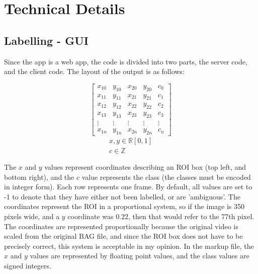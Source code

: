 \section{Technical Details}
    \subsection{Labelling - GUI}
    Since the app is a web app, the code is divided into two parts, the server code, and the client code. The layout of the output is as follows:

    \[
    \begin{bmatrix}
    x_{10} & y_{10} & x_{20} & y_{20} & c_{0} \\
    x_{11} & y_{11} & x_{21} & y_{21} & c_{1} \\
    x_{12} & y_{12} & x_{22} & y_{22} & c_{2} \\
    x_{13} & y_{13} & x_{23} & y_{23} & c_{3} \\
    \vdots & \vdots & \vdots & \vdots & \vdots\\
    x_{1n} & y_{1n} & x_{2n} & y_{2n} & c_{n} 
    \end{bmatrix}
    \]
    \begin{gather*}
    x, y \in \mathbb{R} [0, 1]\\
    c \in \mathbb{Z}
    \end{gather*}

    The $x$ and $y$ values represent coordinates describing an ROI box (top left, and bottom right), and the $c$ value represents the class (the classes must be encoded in integer form). Each row represents one frame. By default, all values are set to -1 to denote that they have either not been labelled, or are 'ambiguous'. The coordinates represent the ROI in a proportional system, so if the image is 350 pixels wide, and a $y$ coordinate was $0.22$, then that would refer to the 77th pixel. The coordinates are represented proportionally because the original video is scaled from the original BAG file, and since the ROI box does not have to be precisely correct, this system is acceptable in my opinion. In the markup file, the $x$ and $y$ values are represented by floating point values, and the class values are signed integers.

